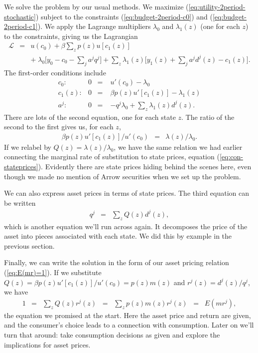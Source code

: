 \documentclass[11pt]{article}
\begin{document}
We solve the problem by our usual methods.
We maximize (\ref{eq:utility-2period-stochastic})
subject to the constraints (\ref{eq:budget-2period-c0}) and (\ref{eq:budget-2period-c1}).
We apply the Lagrange multipliers $\lambda_0$ and $\lambda_1(z)$ (one for each $z$) to the constraints,
giving us the Lagrangian
\begin{eqnarray*}
    \mathcal{L} &=& u(c_0) + \beta \sum_z p(z) u[c_1(z)] \\
        &&   + \; \lambda_0 \Big[ y_0 - c_0 - \sum_j a^j q^j \Big]
        + \sum_z \lambda_1(z) \Big[ y_1(z) + \sum_j a^j d^j(z) - c_1(z) \Big] .
\end{eqnarray*}
The first-order conditions include
\begin{eqnarray*}
  c_0: &        0 \;\;=& u'(c_0) - \lambda_0 \\
  c_1(z): &     0 \;\;=& \beta p(z) u'[c_1(z)] - \lambda_1(z) \\
  a^j: &        0 \;\;=& - q^j \lambda_0 + \sum_z \lambda_1(z) d^j(z) .
\end{eqnarray*}
There are lots of the second equation, one for each state $z$.
The ratio of the second to the first gives us, for each $z$,
\begin{eqnarray*}
    \beta p(z) u'[c_1(z)] / u'(c_0) &=& \lambda(z)/\lambda_0 .
\end{eqnarray*}
If we relabel by $Q(z) = \lambda(z)/\lambda_0$, we have the same relation
we had earlier connecting  the marginal rate of substitution to state prices,
equation (\ref{eq:con-stateprices}).
Evidently there are state prices hiding behind the scenes here,
even though we made no mention of Arrow securities when we set up the problem.

We can also express asset prices in terms of state prices.
The third equation can be written
\begin{eqnarray*}
    q^j &=& \sum_z Q(z) d^j(z) ,
\end{eqnarray*}
which is another equation we'll run across again.
It decomposes the price of the asset into pieces associated with each state.
We did this by example in the previous section.

Finally, we can write the solution in the form of
our asset pricing relation (\ref{eq:E(mr)=1}).
If we substitute
$ Q(z) = \beta p(z) u'[c_1(z)] / u'(c_0) = p(z) m(z)$
and $r^j(z) = d^j(z)/q^j $,
we have
\begin{eqnarray*}
    1 &=& \sum_z Q(z) r^j(z) \;\;=\;\; \sum_z p(z) m(z) r^j(z) \;\;=\;\; E (mr^j) ,
\end{eqnarray*}
the equation we promised at the start.
Here the asset price and return are given,
and the consumer's choice leads to a connection with consumption.
Later on we'll turn that around:
take consumption decisions as given and explore
the implications for asset prices.
\end{document}
